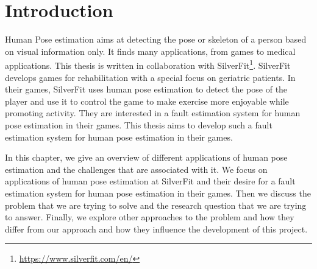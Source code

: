 \chapter{Introduction}
\setcounter{page}{1}

Human Pose estimation aims at detecting the pose or skeleton of a person based on visual information only. It finds many applications, from games to medical applications. This thesis is written in collaboration with SilverFit\footnote{\url{https://www.silverfit.com/en/}}. SilverFit develops games for rehabilitation with a special focus on geriatric patients. In their games, SilverFit uses human pose estimation to detect the pose of the player and use it to control the game to make exercise more enjoyable while promoting activity. They are interested in a fault estimation system for human pose estimation in their games. This thesis aims to develop such a fault estimation system for human pose estimation in their games.

In this chapter, we give an overview of different applications of human pose estimation and the challenges that are associated with it. We focus on applications of human pose estimation at SilverFit and their desire for a fault estimation system for human pose estimation in their games. Then we discuss the problem that we are trying to solve and the research question that we are trying to answer. Finally, we explore other approaches to the problem and how they differ from our approach and how they influence the development of this project.




